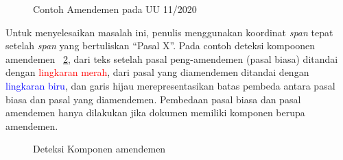 \begin{figure}[H]
  \centering
  \caption{Contoh Amendemen pada UU 11/2020}
  \label{fig:contoh-amendemen}
\end{figure}

Untuk menyelesaikan masalah ini, penulis menggunakan koordinat  \textit{span} tepat
setelah \textit{span} yang bertuliskan ``Pasal X''. Pada contoh deteksi kompoonen amendemen
\pic~\ref{fig:deteksi-amendemen},  dari teks setelah pasal peng-amendemen (pasal biasa)
ditandai dengan \textcolor{red}{lingkaran merah},  dari pasal yang diamendemen ditandai
dengan \textcolor{blue}{lingkaran biru}, dan garis hijau merepresentasikan batas pembeda 
antara pasal biasa dan pasal yang diamendemen. Pembedaan pasal biasa dan pasal amendemen hanya
dilakukan jika dokumen memiliki komponen berupa amendemen.

\begin{figure}[H]
  \centering
  \caption{Deteksi Komponen amendemen}
  \label{fig:deteksi-amendemen}
\end{figure}

